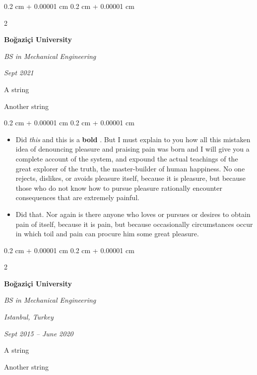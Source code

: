 \documentclass[10pt, letterpaper]{article}
\newenvironment{summary}{
    \begin{description}[
        topsep=0.10 cm,
        parsep=0.10 cm,
        partopsep=0pt,
        itemsep=0pt,
        leftmargin=0.4 cm + 10pt
    ]
}{
    \end{description}
} %
\newenvironment{highlights}{
    \begin{itemize}[
        topsep=0.10 cm,
        parsep=0.10 cm,
        partopsep=0pt,
        itemsep=0pt,
        leftmargin=0.4 cm + 10pt
    ]
}{
    \end{itemize}
} %
\newenvironment{onecolentry}{
    \begin{adjustwidth}{
        0.2 cm + 0.00001 cm
    }{
        0.2 cm + 0.00001 cm
    }
}{
    \end{adjustwidth}
} %
\newenvironment{twocolentry}[2][]{
    \onecolentry
    \def\secondColumn{#2}
    \setcolumnwidth{\fill, 4.5 cm}
    \begin{paracol}{2}
}{
    \switchcolumn \raggedleft \secondColumn
    \end{paracol}
    \endonecolentry
} %
\let\hrefWithoutArrow\href
\renewcommand{\href}[2]{\hrefWithoutArrow{#1}{\ifthenelse{\equal{#2}{}}{ }{#2 }\raisebox{.15ex}{\footnotesize \faExternalLink*}}}
\begin{document}
        \begin{twocolentry}{
            
            
        \textit{Sept 2021}}
            \textbf{Boğaziçi University}

            \textit{BS in Mechanical Engineering}
        \end{twocolentry}
            \begin{summary}
                \item A string
                \item Another string
            \end{summary}
        \vspace{0.10 cm}
        \begin{onecolentry}
            \begin{highlights}
                \item Did \textit{this} and this is a \textbf{bold} \href{https://example.com}{link}. But I must explain to you how all this mistaken idea of denouncing pleasure and praising pain was born and I will give you a complete account of the system, and expound the actual teachings of the great explorer of the truth, the master-builder of human happiness. No one rejects, dislikes, or avoids pleasure itself, because it is pleasure, but because those who do not know how to pursue pleasure rationally encounter consequences that are extremely painful.
                \item Did that. Nor again is there anyone who loves or pursues or desires to obtain pain of itself, because it is pain, but because occasionally circumstances occur in which toil and pain can procure him some great pleasure.
            \end{highlights}
        \end{onecolentry}


        \vspace{0.2 cm}

        \begin{twocolentry}{
        \textit{Istanbul, Turkey}    
            
        \textit{Sept 2015 – June 2020}}
            \textbf{Boğaziçi University}

            \textit{BS in Mechanical Engineering}
        \end{twocolentry}
            \begin{summary}
                \item A string
                \item Another string
            \end{summary}
\end{document}
